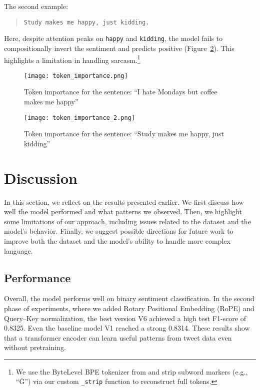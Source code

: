 \documentclass[twocolumn,superscriptaddress,aps]{revtex4-1}
\begin{document}
The second example:
\begin{quote}
\texttt{Study makes me happy, just kidding.}
\end{quote}
Here, despite attention peaks on \texttt{happy} and \texttt{kidding}, the model fails to compositionally invert the sentiment and predicts positive (Figure~\ref{fig:att_ex_2}). This highlights a limitation in handling sarcasm.\footnote{We use the ByteLevel BPE tokenizer from \cite{wolf-etal-2020-transformers} and strip subword markers (e.g., “Ġ”) via our custom \texttt{\_strip} function to reconstruct full tokens.}

\begin{figure}[t]
\texttt{[image: token\_importance.png]}
\caption{Token importance for the sentence: “I hate Mondays but coffee makes me happy”}
\label{fig:att_ex_1}
\end{figure}
\begin{figure}[t]
\texttt{[image: token\_importance\_2.png]}
\caption{Token importance for the sentence: “Study makes me happy, just kidding”}
\label{fig:att_ex_2}
\end{figure}

\section{Discussion}
\label{section:discussion}
In this section, we reflect on the results presented earlier. We first discuss how well the model performed and what patterns we observed. Then, we highlight some limitations of our approach, including issues related to the dataset and the model's behavior. Finally, we suggest possible directions for future work to improve both the dataset and the model's ability to handle more complex language.


\subsection{Performance}
Overall, the model performs well on binary sentiment classification. In the second phase of experiments, where we added Rotary Positional Embedding (RoPE) and Query–Key normalization, the best version V6 achieved a high test F1-score of 0.8325. Even the baseline model V1 reached a strong 0.8314. These results show that a transformer encoder can learn useful patterns from tweet data even without pretraining.
\end{document}
